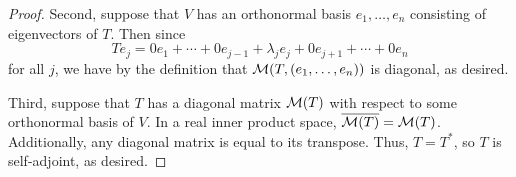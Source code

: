 \documentclass[../main.tex]{subfiles}
\begin{document}
\begin{itemize}
\begin{theorem}
\begin{proof}
            Second, suppose that $V$ has an orthonormal basis $e_1,\dots,e_n$ consisting of eigenvectors of $T$. Then since
            \begin{equation*}
                Te_j = 0e_1+\cdots+0e_{j-1}+\lambda_je_j+0e_{j+1}+\cdots+0e_n
            \end{equation*}
            for all $j$, we have by the definition that $\mathcal{M}(T,(e_1,\dots,e_n))$ is diagonal, as desired.\par
            Third, suppose that $T$ has a diagonal matrix $\mathcal{M}(T)$ with respect to some orthonormal basis of $V$. In a real inner product space, $\overline{\mathcal{M}(T)}=\mathcal{M}(T)$. Additionally, any diagonal matrix is equal to its transpose. Thus, $T=T^*$, so $T$ is self-adjoint, as desired.
        \end{proof}
    \end{theorem}
\end{itemize}
\end{document}
